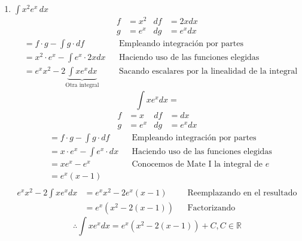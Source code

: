 \documentclass[letterpaper]{article}
\newcommand{\R}{\mathds{R}}
\renewcommand{\*}{\cdot}
\theoremstyle{definition}
\begin{document}
\begin{enumerate}
\begin{enumerate}
	\item$\displaystyle \int x^2 e^x \, dx$
	\begin{align*}
		f &= x^2 & df &= 2x dx\\
		g &= e^x & dg &= e^xdx
	\end{align*}
	\begin{align*}
		&= f \* g - \int g\*df &&\text{Empleando integración por partes}\\
		&= x^2 \* e^x - \int e^x \* 2xdx &&\text{Haciendo uso de las funciones elegidas}\\
		&= e^x x^2 -2\underbrace{\int xe^xdx}_\text{Otra integral} &&\text{Sacando escalares por la linealidad de la integral}
	\end{align*}
	\[ \int xe^xdx = \]
	\begin{align*}
		f &= x & df &= dx\\
		g &= e^x & dg &= e^xdx
	\end{align*}
	\begin{align*}
		&= f \* g - \int g\*df &&\text{Empleando integración por partes}\\
		&= x\* e^x - \int e^x \*dx &&\text{Haciendo uso de las funciones elegidas}\\
		&= xe^x - e^x &&\text{Conocemos de Mate I la integral de }e\\
		&= e^x(x - 1)\\
	\end{align*}
	\begin{align*}
		e^x x^2 -2\int xe^xdx &= e^x x^2 -2e^x(x-1) &&\text{Reemplazando en el resultado anterior}\\
		&= e^x(x^2 -2(x-1)) &&\text{Factorizando}
	\end{align*}
	\[ \therefore \int xe^xdx = e^x(x^2 -2(x-1)) + C, C \in \R \]
	

\end{enumerate}
\end{enumerate}
\end{document}
